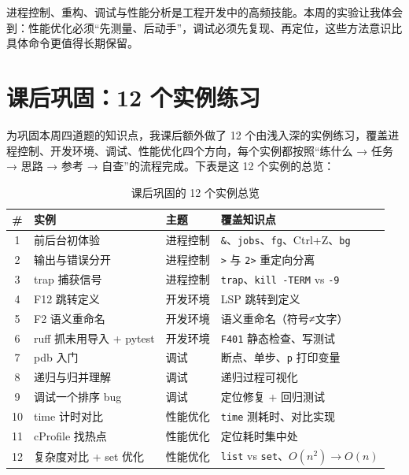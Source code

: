 \documentclass[a4paper, 12pt]{article}
\begin{document}
进程控制、重构、调试与性能分析是工程开发中的高频技能。本周的实验让我体会到：性能优化必须“先测量、后动手”，调试必须先复现、再定位，这些方法意识比具体命令更值得长期保留。

\section{课后巩固：12 个实例练习}

为巩固本周四道题的知识点，我课后额外做了 12 个由浅入深的实例练习，覆盖进程控制、开发环境、调试、性能优化四个方向，每个实例都按照“练什么 → 任务 → 思路 → 参考 → 自查”的流程完成。下表是这 12 个实例的总览：

\begin{table}[h]
  \centering
  \small
  \begin{tabular}{cllp{6.5cm}}
    \toprule
    \textbf{\#} & \textbf{实例} & \textbf{主题} & \textbf{覆盖知识点} \\
    \midrule
    1 & 前后台初体验 & 进程控制 & \texttt{\&}、\texttt{jobs}、\texttt{fg}、Ctrl+Z、\texttt{bg} \\
    2 & 输出与错误分开 & 进程控制 & \texttt{>} 与 \texttt{2>} 重定向分离 \\
    3 & trap 捕获信号 & 进程控制 & \texttt{trap}、\texttt{kill -TERM} vs \texttt{-9} \\
    4 & F12 跳转定义 & 开发环境 & LSP 跳转到定义 \\
    5 & F2 语义重命名 & 开发环境 & 语义重命名（符号≠文字） \\
    6 & ruff 抓未用导入 + pytest & 开发环境 & \texttt{F401} 静态检查、写测试 \\
    7 & pdb 入门 & 调试 & 断点、单步、\texttt{p} 打印变量 \\
    8 & 递归与归并理解 & 调试 & 递归过程可视化 \\
    9 & 调试一个排序 bug & 调试 & 定位修复 + 回归测试 \\
    10 & time 计时对比 & 性能优化 & \texttt{time} 测耗时、对比实现 \\
    11 & cProfile 找热点 & 性能优化 & 定位耗时集中处 \\
    12 & 复杂度对比 + set 优化 & 性能优化 & \texttt{list} vs \texttt{set}、$O(n^2)\rightarrow O(n)$ \\
    \bottomrule
  \end{tabular}
  \caption{课后巩固的 12 个实例总览}
  \label{tab:practice2}
\end{table}
\end{document}
